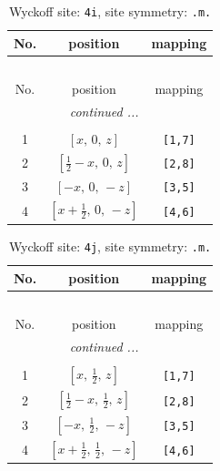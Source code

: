 \documentclass[fleqn,8pt]{jsarticle}
\begin{document}
\renewcommand{\arraystretch}{1.2}
\begin{longtable}{ccc}
\caption{Wyckoff site: {\tt 4i}, site symmetry: {\tt .m.}}
 \\
 \hline \hline
No. & position & mapping \\ \hline \endfirsthead

\multicolumn{2}{l}{\tablename\ \thetable{}} \\
 \hline \hline
No. & position & mapping \\ \hline \endhead

 \hline \hline
\multicolumn{2}{r}{\footnotesize\it continued ...} \\ \endfoot

 \hline \hline
\multicolumn{2}{r}{} \\ \endlastfoot

1 & $\left[ x,\, 0,\, z \right]$ & {\tt [1,7]} \\ \hline
2 & $\left[ \frac{1}{2} - x,\, 0,\, z \right]$ & {\tt [2,8]} \\ \hline
3 & $\left[ - x,\, 0,\, - z \right]$ & {\tt [3,5]} \\ \hline
4 & $\left[ x + \frac{1}{2},\, 0,\, - z \right]$ & {\tt [4,6]} \\
\end{longtable}
\renewcommand{\arraystretch}{1.2}
\begin{longtable}{ccc}
\caption{Wyckoff site: {\tt 4j}, site symmetry: {\tt .m.}}
 \\
 \hline \hline
No. & position & mapping \\ \hline \endfirsthead

\multicolumn{2}{l}{\tablename\ \thetable{}} \\
 \hline \hline
No. & position & mapping \\ \hline \endhead

 \hline \hline
\multicolumn{2}{r}{\footnotesize\it continued ...} \\ \endfoot

 \hline \hline
\multicolumn{2}{r}{} \\ \endlastfoot

1 & $\left[ x,\, \frac{1}{2},\, z \right]$ & {\tt [1,7]} \\ \hline
2 & $\left[ \frac{1}{2} - x,\, \frac{1}{2},\, z \right]$ & {\tt [2,8]} \\ \hline
3 & $\left[ - x,\, \frac{1}{2},\, - z \right]$ & {\tt [3,5]} \\ \hline
4 & $\left[ x + \frac{1}{2},\, \frac{1}{2},\, - z \right]$ & {\tt [4,6]} \\
\end{longtable}
\end{document}
